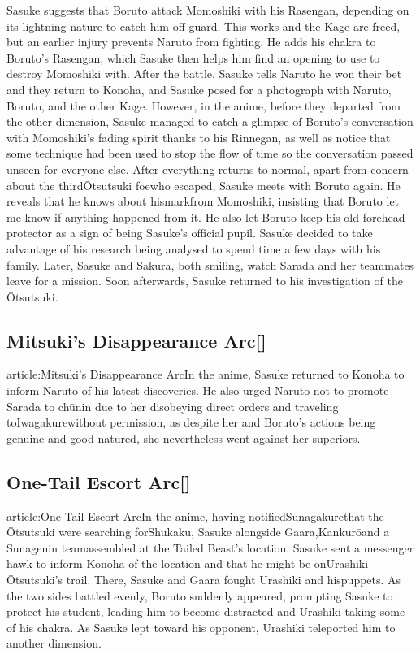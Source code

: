 \documentclass[a4paper,12pt]{article}
\begin{document}
Sasuke suggests that Boruto attack Momoshiki with his Rasengan, depending on its lightning nature to catch him off guard. This works and the Kage are freed, but an earlier injury prevents Naruto from fighting. He adds his chakra to Boruto's Rasengan, which Sasuke then helps him find an opening to use to destroy Momoshiki with. After the battle, Sasuke tells Naruto he won their bet and they return to Konoha, and Sasuke posed for a photograph with Naruto, Boruto, and the other Kage. However, in the anime, before they departed from the other dimension, Sasuke managed to catch a glimpse of Boruto's conversation with Momoshiki's fading spirit thanks to his Rinnegan, as well as notice that some technique had been used to stop the flow of time so the conversation passed unseen for everyone else. After everything returns to normal, apart from concern about the thirdŌtsutsuki foewho escaped, Sasuke meets with Boruto again. He reveals that he knows about hismarkfrom Momoshiki, insisting that Boruto let me know if anything happened from it. He also let Boruto keep his old forehead protector as a sign of being Sasuke's official pupil. Sasuke decided to take advantage of his research being analysed to spend time a few days with his family. Later, Sasuke and Sakura, both smiling, watch Sarada and her teammates leave for a mission. Soon afterwards, Sasuke returned to his investigation of the Ōtsutsuki.\\ \par \vspace{0.5cm}

\subsection*{Mitsuki's Disappearance Arc[]}\n\nMain article:Mitsuki's Disappearance ArcIn the anime, Sasuke returned to Konoha to inform Naruto of his latest discoveries. He also urged Naruto not to promote Sarada to chūnin due to her disobeying direct orders and traveling toIwagakurewithout permission, as despite her and Boruto's actions being genuine and good-natured, she nevertheless went against her superiors.\\ \par \vspace{0.5cm}

\subsection*{One-Tail Escort Arc[]}\n\nMain article:One-Tail Escort ArcIn the anime, having notifiedSunagakurethat the Ōtsutsuki were searching forShukaku, Sasuke alongside Gaara,Kankurōand a Sunagenin teamassembled at the Tailed Beast's location. Sasuke sent a messenger hawk to inform Konoha of the location and that he might be onUrashiki Ōtsutsuki's trail. There, Sasuke and Gaara fought Urashiki and hispuppets. As the two sides battled evenly, Boruto suddenly appeared, prompting Sasuke to protect his student, leading him to become distracted and Urashiki taking some of his chakra. As Sasuke lept toward his opponent, Urashiki teleported him to another dimension.\\ \par \vspace{0.5cm}
\end{document}
